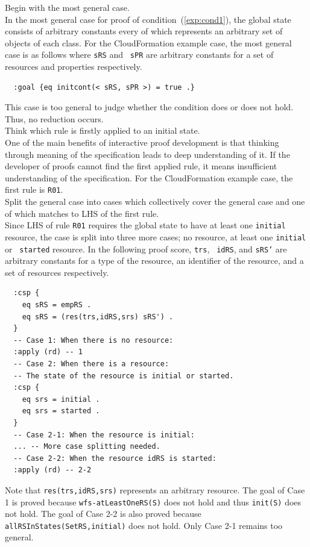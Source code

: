 \documentclass[12pt]{report}
\newcommand{\stt}[1]{{\small{\tt {#1}}}}
\begin{document}
 Begin with the most general case. \\ In the
most general case for proof of condition~(\ref{exp:cond1}), the global
state consists of arbitrary constants every of which represents an
arbitrary set of objects of each class. For the CloudFormation example
case, the most general case is as follows where {\tt sRS} and {\tt
  sPR} are arbitrary constants for a set of resources and properties
respectively. 
\begin{verbatim}
  :goal {eq initcont(< sRS, sPR >) = true .}
\end{verbatim}
This case is too general to judge whether the condition does or does
not hold. Thus, no reduction occurs.\\

 Think which rule is firstly applied to an
initial state. \\ One of the main benefits of interactive proof
development is that thinking through meaning of the specification
leads to deep understanding of it. If the developer of proofs cannot
find the first applied rule, it means insufficient understanding of
the specification. For the CloudFormation example case, the first rule
is {\tt R01}. \\

 Split the general case into cases which
collectively cover the general case and one of which matches to LHS of
the first rule. \\ Since LHS of rule {\tt R01} requires the global
state to have at least one {\tt initial} resource, the case is split
into three more cases; no resource, at least one {\tt initial} or {\tt
  started} resource. In the following proof score, {\tt trs}, {\tt
  idRS}, and {\tt sRS'} are arbitrary constants for a type of the
resource, an identifier of the resource, and a set of resources
respectively. 
\begin{verbatim}
  :csp { 
    eq sRS = empRS .
    eq sRS = (res(trs,idRS,srs) sRS') .
  }
  -- Case 1: When there is no resource:
  :apply (rd) -- 1
  -- Case 2: When there is a resource:
  -- The state of the resource is initial or started.
  :csp { 
    eq srs = initial .
    eq srs = started .
  }
  -- Case 2-1: When the resource is initial:
  ... -- More case splitting needed.
  -- Case 2-2: When the resource idRS is started:
  :apply (rd) -- 2-2
\end{verbatim}
Note that \stt{res(trs,idRS,srs)} represents an arbitrary resource.
The goal of Case 1 is proved because \stt{wfs-atLeastOneRS(S)} does
not hold and thus \stt{init(S)} does not hold. The goal of Case 2-2 is
also proved because \stt{allRSInStates(SetRS,initial)} does not hold.
Only Case 2-1 remains too general.\\
\end{document}
